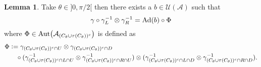 \documentclass[12pt,a4paper,twoside]{article}
\newcommand{\defeq}{\vcentcolon=}
\let\originalleft\left
\let\originalright\right
\renewcommand{\left}{\mathopen{}\mathclose\bgroup\originalleft}
\renewcommand{\right}{\aftergroup\egroup\originalright}
\newcommand{\UU}{\mathcal U}
\renewcommand{\AA}{\mathcal A}
\newcommand{\Ad}[1]{\textrm{Ad}\left(#1\right)}
\newcommand{\Aut}[1]{\textrm{Aut}\left(#1\right)}
\theoremstyle{definition}
\newtheorem{lemma}[theorem]{Lemma}
\numberwithin{equation}{section}
\begin{document}
 \begin{lemma}\label{lem:AutomorphismAfterSplittingIsInCone}
 	Take $\theta\in]0,\pi/2[$ then there exists a $b\in\UU(\AA)$ such that
 	\begin{equation}\label{eq:AutomorphismAfterSplittingIsInConeEquation1}
 	\gamma\circ\gamma_L^{-1}\otimes\gamma_R^{-1}=\Ad{b}\circ\Phi
 	\end{equation}
 	where $\Phi\in\Aut{\AA_{(C_\theta\cup \tau(C_\theta))^c}}$ is defined as
 	\begin{align}
 	\Phi&\defeq\gamma_{(C_\theta\cup\tau(C_\theta))^c\cap U}\otimes\gamma_{(C_\theta\cup\tau(C_\theta))^c\cap D}\\
 	\nonumber
 	&\quad\circ (\gamma_{(C_\theta\cup\tau(C_\theta))^c\cap L\cap U}^{-1}\otimes\gamma_{(C_\theta\cup\tau(C_\theta))^c\cap R\cap U}^{-1})\otimes (\gamma_{(C_\theta\cup\tau(C_\theta))^c\cap L\cap D}^{-1}\otimes\gamma_{(C_\theta\cup\tau(C_\theta))^c\cap R\cap D}^{-1}).
 	\end{align}
 \end{lemma}
\end{document}
